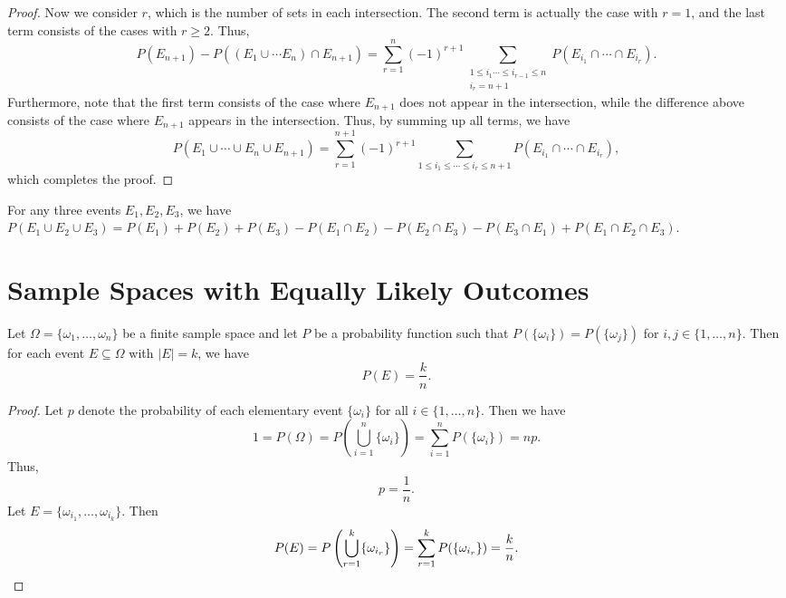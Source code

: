 \begin{proof}
  Now we consider $r$, which is the number of sets in each intersection.
  The second term is actually the case with $r = 1$, and the last term
  consists of the cases with $r \geq 2$. Thus,
  \begin{equation*}
    P(E_{n+1}) - P((E_1 \cup \cdots E_n) \cap E_{n+1})
    = \sum_{r=1}^n (-1)^{r+1}
      \sum_{\substack{1 \leq i_1 \cdots \leq i_{r-1} \leq n \\ i_r = n+1}}
      P(E_{i_1} \cap \cdots \cap E_{i_r}).
  \end{equation*}
  Furthermore, note that the first term consists of the case where $E_{n+1}$
  does not appear in the intersection, while the difference above consists
  of the case where $E_{n+1}$ appears in the intersection.
  Thus, by summing up all terms, we have
  \begin{equation*}
    P(E_1 \cup \cdots \cup E_n \cup E_{n+1})
    = \sum_{r=1}^{n+1} (-1)^{r+1}
      \sum_{1 \leq i_1 \leq \cdots \leq i_r \leq n+1}
      P(E_{i_1} \cap \cdots \cap E_{i_r}),
  \end{equation*}
  which completes the proof.
\end{proof}
\begin{example}
  For any three events $E_1, E_2, E_3$, we have $P(E_1 \cup E_2 \cup E_3) =
  P(E_1) + P(E_2) + P(E_3) - P(E_1 \cap E_2) - P(E_2 \cap E_3)
  - P(E_3 \cap E_1) + P(E_1 \cap E_2 \cap E_3)$.
\end{example}

\section{Sample Spaces with Equally Likely Outcomes}
\begin{theorem}
  Let $\Omega = \{\omega_1, \dots, \omega_n\}$ be a finite sample space and
  let $P$ be a probability function such that
  $P(\{\omega_i\}) = P(\{\omega_j\})$ for $i, j \in \{1, \dots, n\}$.
  Then for each event $E \subseteq \Omega$ with $|E| = k$, we have
  \begin{equation*}
    P(E) = \frac{k}{n}.
  \end{equation*}
\end{theorem}
\begin{proof}
  Let $p$ denote the probability of each elementary event $\{\omega_i\}$ for
  all $i \in \{1, \dots, n\}$. Then we have
  \begin{equation*}
    1 = P(\Omega)
      = P\left(\bigcup_{i=1}^n \{\omega_i\}\right)
      = \sum_{i=1}^n P(\{\omega_i\})
      = np.
  \end{equation*}
  Thus,
  \begin{equation*}
    p = \frac{1}{n}.
  \end{equation*}
  Let $E = \{\omega_{i_1}, \dots, \omega_{i_k}\}$. Then
  \begin{equation*}
    P(E) = P\left(\bigcup_{r=1}^k \{\omega_{i_r}\}\right)
         = \sum_{r=1}^k P(\{\omega_{i_r}\})
         = \frac{k}{n}. \qedhere
  \end{equation*}
\end{proof}